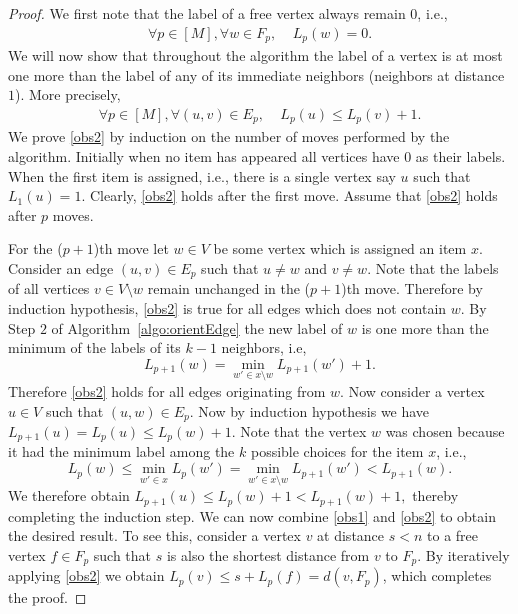 \begin{proof}
We first note that the label of a free vertex always remain $0$, i.e.,
\begin{align}\label{obs1} \forall p\in [M], \forall w\in F_p, ~~~~~L_p(w)=0. \end{align}
We will now show that throughout the algorithm the label of a vertex is at most one more than the label of any of its immediate neighbors (neighbors at distance $1$). More precisely,
\begin{align}\label{obs2}
\forall p\in [M], \forall (u,v)\in E_p, ~~~~~ L_p(u)\le L_p(v)+1. \end{align}
We prove \eqref{obs2} by induction on the number of moves performed by the algorithm. Initially when no item has appeared all vertices have $0$ as their labels. When the first item is assigned, i.e., there is a single vertex say $u$ such that $L_1(u)=1$. Clearly, \eqref{obs2} holds after the first move. Assume that \eqref{obs2} holds after $p$ moves.

For the ($p+1$)th move let $w\in V$ be some vertex which is assigned an item $x$. Consider an edge $(u,v)\in E_p$ such that $u\neq w$ and $v\neq w$. Note that the labels of all vertices $v \in V\setminus w$ remain unchanged in the ($p+1$)th move. Therefore by induction hypothesis, \eqref{obs2} is true for all edges which does not contain $w$. By Step $2$ of Algorithm~\ref{algo:orientEdge} the new label of $w$ is one more than the minimum of the labels of its $k-1$ neighbors, i.e, \[L_{p+1}(w) =  \min_{w'\in x\setminus w} L_{p+1}(w') +1.\] Therefore \eqref{obs2} holds for all edges originating from $w$. Now consider a vertex $u\in V$ such that $(u,w)\in E_p$. Now by induction hypothesis we have $L_{p+1}(u)=L_p(u)\le L_p(w) +1.$ Note that the vertex $w$ was chosen because it had the minimum label among the $k$ possible choices for the item $x$, i.e., 
\[ L_p(w) \le \min_{w'\in x} L_{p} (w') = \min_{w'\in x\setminus w} L_{p+1} (w') < L_{p+1}(w).\] We therefore obtain
$ L_{p+1}(u)\le L_p(w) +1 < L_{p+1}(w) +1,$
thereby completing the induction step.
We can now combine \eqref{obs1} and \eqref{obs2} to obtain the desired result. To see this, consider a vertex $v$ at distance $s< n$ to a free vertex $f\in F_p$ such that $s$ is also the shortest distance from $v$ to $F_p$.  By iteratively applying \eqref{obs2} we obtain $L_p(v) \le s+ L_p(f) =d(v,F_p)$, which completes the proof.
\end{proof}
